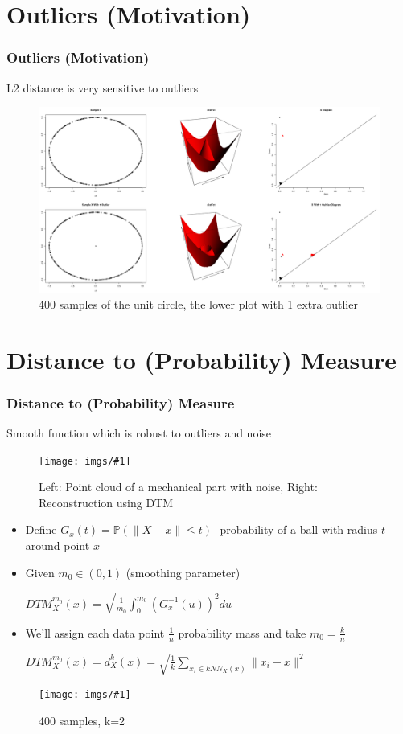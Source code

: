 \documentclass[9pt, dvipsnames]{beamer} %
\def\norm#1{\mathopen\| #1 \mathclose\|}%
\newcommand {\image}[3] {
    \begin{figure}
        \begin{center}
		\texttt{[image: imgs/\#1]}
		\caption{#2}
        \end{center}
    \end{figure}
}
\begin{document}
	\section{Outliers (Motivation)}\label{sec:out}
	\begin{frame}
		\frametitle{\textbf{Outliers (Motivation)}}
		\centering
			L2 distance is very sensitive to outliers\\
	    \begin{figure}
		    \centering
			 \includegraphics[width=\linewidth]{imgs/outlier_demo.png}
		    \caption{400 samples of the unit circle, the lower plot with 1 extra outlier}
	    \end{figure}
	\end{frame}

	\section{Distance to (Probability) Measure}\label{sec:dtm}
	\begin{frame}
		\frametitle{\textbf{Distance to (Probability) Measure}}
		\centerline{Smooth function which is robust to outliers and noise}
		\image{mechanical_outliers.png}{Left: Point cloud of a mechanical part with noise, Right: Reconstruction using DTM}{0.9}
	\end{frame}
	\begin{frame}
		\begin{itemize}
			\item
				Define $G_x(t) = \mathbb{P} \left( \norm{X - x} \leq t \right)$- probability of a ball with radius $t$ around point $x$

			\item
				Given $m_0 \in (0,1)$ (smoothing parameter) \\
				\centerline{$DTM_X^{m_0}(x) = \sqrt{\frac{1}{m_0} \int_0^{m_0} \left( G_x^{-1} (u) \right)^2 du}$} \item
				We'll assign each data point $\frac{1}{n}$ probability mass 
				and take $m_0 = \frac{k}{n}$\\
				\centerline{$DTM_X^{m_0}(x) = d_X^k(x) = \sqrt{\frac{1}{k} \sum_{x_i \in kNN_X(x)} \norm{x_i -x}^2}$}
		\end{itemize}
	\end{frame}
	\begin{frame}
		\image{dtm_demo.png}{400 samples, k=2}{0.9}
	\end{frame}
\end{document}
